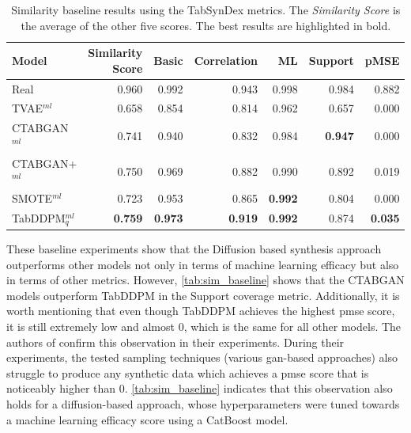 \begin{table}[h]
	\centering
	\begin{tabular}{lrrrrrr}
		\toprule
		\textbf{Model}     & \textbf{Similarity Score} & \textbf{Basic} & \textbf{Correlation} & \textbf{ML}    & \textbf{Support} & \textbf{pMSE}  \\
		\midrule
		Real               & 0.960                     & 0.992          & 0.943                & 0.998          & 0.984            & 0.882          \\
		TVAE$^{ml}$        & 0.658                     & 0.854          & 0.814                & 0.962          & 0.657            & 0.000          \\
		CTABGAN$^{ml}$     & 0.741                     & 0.940          & 0.832                & 0.984          & \textbf{0.947}   & 0.000          \\
		CTABGAN+$^{ml}$    & 0.750                     & 0.969          & 0.882                & 0.990          & 0.892            & 0.019          \\
		SMOTE$^{ml}$       & 0.723                     & 0.953          & 0.865                & \textbf{0.992} & 0.804            & 0.000          \\
		TabDDPM$^{ml}_{q}$ & \textbf{0.759}            & \textbf{0.973} & \textbf{0.919}       & \textbf{0.992} & 0.874            & \textbf{0.035} \\
		\bottomrule
	\end{tabular}
	\caption[TabSynDex Baseline]{Similarity baseline results using the TabSynDex metrics. The \textit{Similarity Score} is the average of the other five scores. The best results are highlighted in bold.}
	\label{tab:sim_baseline}
\end{table}

These baseline experiments show that the Diffusion based synthesis approach outperforms other models not only in terms of machine learning efficacy but also in terms of other metrics.
However, \autoref{tab:sim_baseline} shows that the CTABGAN models outperform TabDDPM in the Support coverage metric.
Additionally, it is worth mentioning that even though TabDDPM achieves the highest \gls{pmse} score, it is still extremely low and almost 0, which is the same for all other models.
The authors of \cite{chundawat2022UniversalMetricRobust} confirm this observation in their experiments.
During their experiments, the tested sampling techniques (various \gls{gan}-based approaches) also struggle to produce any synthetic data which achieves a \gls{pmse} score that is noticeably higher than 0.
\autoref{tab:sim_baseline} indicates that this observation also holds for a diffusion-based approach, whose hyperparameters were tuned towards a machine learning efficacy score using a CatBoost model.

